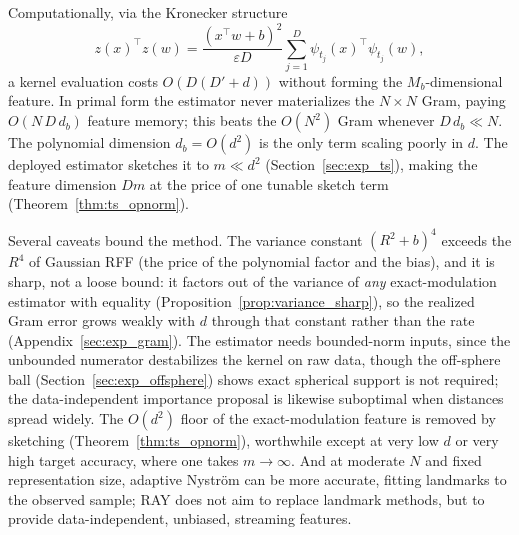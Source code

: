 \documentclass{article}
\begin{document}
Computationally, via the Kronecker structure
\begin{equation}\label{eq:kronecker}
z(x)^\top z(w)=\frac{(x^\top w+b)^2}{\varepsilon D}\sum_{j=1}^D\psi_{t_j}(x)^\top\psi_{t_j}(w),
\end{equation}
a kernel evaluation costs $O(D(D'+d))$ without forming the $M_b$-dimensional feature. In primal form the estimator never materializes the $N\times N$ Gram, paying $O(N\,D\,d_b)$ feature memory; this beats the $O(N^2)$ Gram whenever $D\,d_b\ll N$. The polynomial dimension $d_b=O(d^2)$ is the only term scaling poorly in $d$. The deployed estimator sketches it to $m\ll d^2$ (Section~\ref{sec:exp_ts}), making the feature dimension $Dm$ at the price of one tunable sketch term (Theorem~\ref{thm:ts_opnorm}).

Several caveats bound the method. The variance constant $(R^2+b)^4$ exceeds the $R^4$ of Gaussian RFF (the price of the polynomial factor and the bias), and it is sharp, not a loose bound: it factors out of the variance of \emph{any} exact-modulation estimator with equality (Proposition~\ref{prop:variance_sharp}), so the realized Gram error grows weakly with $d$ through that constant rather than the rate (Appendix~\ref{sec:exp_gram}). The estimator needs bounded-norm inputs, since the unbounded numerator destabilizes the kernel on raw data, though the off-sphere ball (Section~\ref{sec:exp_offsphere}) shows exact spherical support is not required; the data-independent importance proposal is likewise suboptimal when distances spread widely. The $O(d^2)$ floor of the exact-modulation feature is removed by sketching (Theorem~\ref{thm:ts_opnorm}), worthwhile except at very low $d$ or very high target accuracy, where one takes $m\to\infty$. And at moderate $N$ and fixed representation size, adaptive Nystr\"om can be more accurate, fitting landmarks to the observed sample; RAY does not aim to replace landmark methods, but to provide data-independent, unbiased, streaming features.
\end{document}
